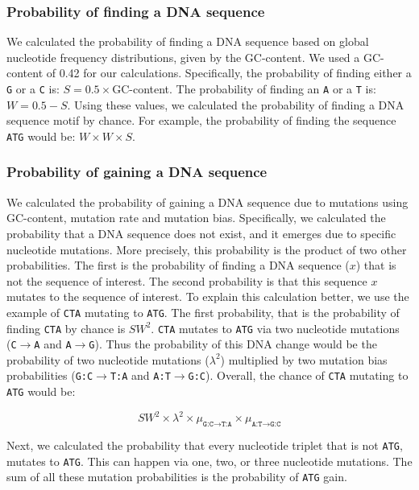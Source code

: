 \documentclass[12pt,a4paper]{article}
\begin{document}
\subsubsection{Probability of finding a DNA sequence}
\label{methprob}

We calculated the probability of finding a DNA sequence based on global nucleotide frequency distributions, given by the GC-content. We used a GC-content of 0.42 for our calculations. Specifically, the probability of finding either a \texttt{G} or a \texttt{C} is: $S = 0.5\times$GC-content. The probability of finding an \texttt{A} or a \texttt{T} is: $W = 0.5 - S$. Using these values, we calculated the probability of finding a DNA sequence motif by chance. For example, the probability of finding the sequence \texttt{ATG} would be: $W\times W \times S$.

\subsubsection{Probability of gaining a DNA sequence}
\label{methgain}

We calculated the probability of gaining a DNA sequence due to mutations using GC-content, mutation rate and mutation bias. Specifically, we calculated the probability that a DNA sequence does not exist, and it emerges due to specific nucleotide mutations. More precisely, this probability is the product of two other probabilities. The first is the probability of finding a DNA sequence ($x$) that is not the sequence of interest. The second probability is that this sequence $x$ mutates to the sequence of interest. To explain this calculation better, we use the example of \texttt{CTA} mutating to \texttt{ATG}. The first probability, that is the probability of finding \texttt{CTA} by chance is $SW^2$. \texttt{CTA} mutates to \texttt{ATG} via two nucleotide mutations (\texttt{C}$\to$\texttt{A} and \texttt{A}$\to$\texttt{G}). Thus the probability of this DNA change would be the probability of two nucleotide mutations ($\lambda^2$) multiplied by two mutation bias probabilities (\texttt{G:C}$\to$\texttt{T:A} and \texttt{A:T}$\to$\texttt{G:C}). Overall, the chance of \texttt{CTA} mutating to \texttt{ATG} would be:

$$SW^2 \times \lambda^2 \times \mu_{\texttt{G:C}\to\texttt{T:A}} \times \mu_{\texttt{A:T}\to\texttt{G:C}}$$

Next, we calculated the probability that every nucleotide triplet that is not \texttt{ATG}, mutates to \texttt{ATG}. This can happen via one, two, or three nucleotide mutations. The sum of all these mutation probabilities is the probability of \texttt{ATG} gain.
\end{document}
